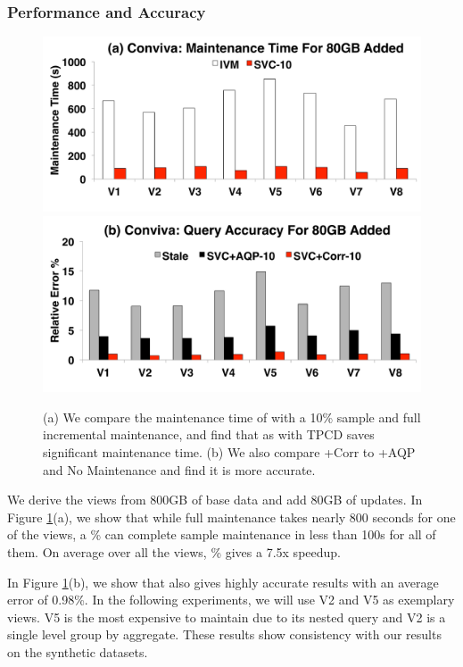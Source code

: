 \subsubsection{Performance and Accuracy}
\begin{figure}[t] \vspace{-2em}
\centering
 \includegraphics[scale=0.105]{exp/con_3.pdf}
 \includegraphics[scale=0.105]{exp/con_4.pdf} \vspace{-1.0em}
 \caption{(a) We compare the maintenance time of \svc with a 10\% sample and full incremental maintenance, and find that as with TPCD \svc saves significant maintenance time. (b) We also compare \svcnospace+Corr to \svcnospace+AQP and No Maintenance and find it is more accurate. \label{conv-1}}
\end{figure}
We derive the views from 800GB of base data and add 80GB of updates.
In Figure \ref{conv-1}(a), we show that while full maintenance takes nearly 800 seconds for one of the views, a \% can complete sample maintenance in less than 100s for all of them.
On average over all the views, \% gives a 7.5x speedup.

In Figure \ref{conv-1}(b), we show that \svc also gives highly accurate results with an average error of 0.98\%.
In the following experiments, we will use V2 and V5 as exemplary views.
V5 is the most expensive to maintain due to its nested query and V2 is a single level group by aggregate.
These results show consistency with our results on the synthetic datasets.

